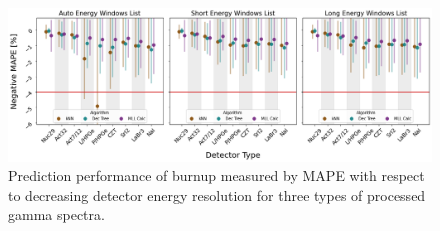 \begin{figure}[!htb]
  \centering
  \includegraphics[width=\textwidth]{./chapters/exp2/detector_preds_wrt_enlist_MAPE_burn.png}
  \caption[Prediction performance of burnup regression with decreasing detector 
           energy resolution]
          {Prediction performance of burnup measured by \acrshort{MAPE} with 
           respect to decreasing detector energy resolution for three types 
           of processed gamma spectra.}
  \label{fig:burn}
\end{figure}

